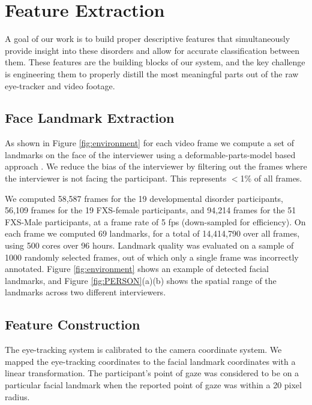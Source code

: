 \documentclass[10pt,twocolumn,letterpaper]{article}
\begin{document}
\section{Feature Extraction}
\label{sec:feature_extraction}
A goal of our work is to build proper descriptive features that simultaneously provide insight into these disorders and allow for accurate classification between them. These features are the building blocks of our system, and the key challenge is engineering them to properly distill the most meaningful parts out of the raw eye-tracker and video footage.

\subsection{Face Landmark Extraction}
As shown in Figure \ref{fig:environment} for each video frame we compute a set of landmarks on the face of the interviewer using a deformable-parts-model based approach \cite{dpmface}. We reduce the bias of the interviewer by filtering out the frames where the interviewer is not facing the participant. This represents $<$1\% of all frames.

We computed 58,587 frames for the 19 developmental disorder participants, 56,109 frames for the 19 FXS-female participants, and 94,214 frames for the 51 FXS-Male participants, at a frame rate of 5 fps (down-sampled for efficiency). On each frame we computed 69 landmarks, for a total of 14,414,790 over all frames, using 500 cores over 96 hours. Landmark quality was evaluated on a sample of 1000 randomly selected frames, out of which only a single frame was incorrectly annotated. Figure \ref{fig:environment} shows an example of detected facial landmarks, and Figure \ref{fig:PERSON}(a)(b) shows the spatial range of the landmarks across two different interviewers. 
 
\subsection{Feature Construction}
\label{ssec:feature_construction}
The eye-tracking system is calibrated to the camera coordinate system. We mapped the eye-tracking coordinates to the facial landmark coordinates with a linear transformation. The participant's point of gaze was considered to be on a particular facial landmark when the reported point of gaze was within a 20 pixel radius. %
\end{document}
